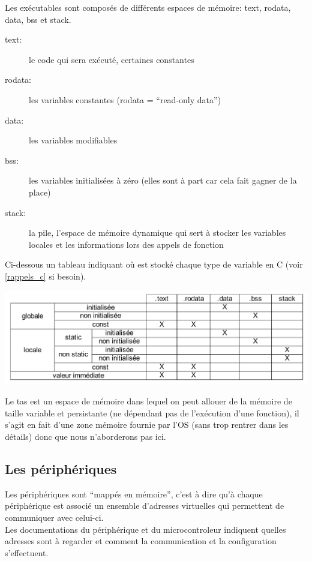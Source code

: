 \documentclass[a4paper,10pt]{article} %
\begin{document}
Les exécutables sont composés de différents espaces de mémoire: text, rodata, data, bss et stack.

\begin{description}
    \item[text:] le code qui sera exécuté, certaines constantes
    \item[rodata:] les variables constantes (rodata = ``read-only data'')
    \item[data:] les variables modifiables
    \item[bss:] les variables initialisées à zéro (elles sont à part car cela fait gagner de la place)
    \item[stack:] la pile, l'espace de mémoire dynamique qui sert à stocker les variables locales et les informations lors des appels de fonction
\end{description}

Ci-dessous un tableau indiquant où est stocké chaque type de variable en C (voir \autoref{rappels_c}  si besoin).

\includegraphics[scale=0.35]{assets/memory.png}

Le tas est un espace de mémoire dans lequel on peut allouer de la mémoire de taille variable et persistante (ne dépendant pas de l’exécution d'une fonction), il s'agit en fait d'une zone mémoire fournie par l'OS (sans trop rentrer dans les détails) donc que nous n'aborderons pas ici.

\subsection{Les périphériques}
Les périphériques sont ``mappés en mémoire'', c'est à dire qu'à chaque périphérique est associé un ensemble d'adresses virtuelles qui permettent de communiquer avec celui-ci.\\

Les documentations du périphérique et du microcontroleur indiquent quelles adresses sont à regarder et comment la communication et la configuration s'effectuent.
\end{document}
